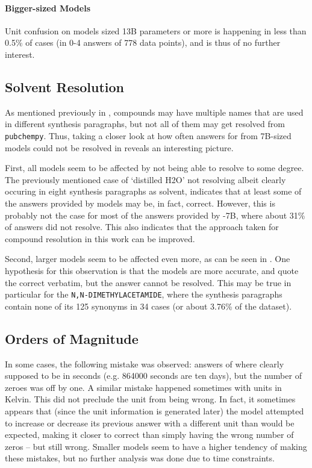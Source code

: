 \paragraph{Bigger-sized Models}
Unit confusion on models sized 13B parameters or more is happening in less than 0.5\% of cases (in 0-4 answers of 778 data points), and is thus of no further interest.


\subsection{Solvent Resolution}\label{sub:solv}
As mentioned previously in , compounds may have multiple names that are used in different synthesis paragraphs, but not all of them may get resolved from \texttt{pubchempy}.
Thus, taking a closer look at how often answers for \tsolv from 7B-sized models could not be resolved in  reveals an interesting picture.

First, all models seem to be affected by not being able to resolve \tsolv to some degree.
The previously mentioned case of `distilled H2O' not resolving albeit clearly occuring in eight synthesis paragraphs as solvent, indicates that at least some of the answers provided by models may be, in fact, correct.
However, this is probably not the case for most of the answers provided by -7B, where about 31\% of answers did not resolve.
This also indicates that the approach taken for compound resolution in this work can be improved.

Second, larger models seem to be affected even more, as can be seen in .
One hypothesis for this observation is that the models are more accurate, and quote the correct \tsolv verbatim, but the answer cannot be resolved.
This may be true in particular for the \tsolv \texttt{N,N-DIMETHYLACETAMIDE}, where the synthesis paragraphs contain none of its 125 synonyms in 34 cases (or about 3.76\% of the dataset).

\subsection{Orders of Magnitude}\label{sub:oom}
In some cases, the following mistake was observed:
answers of \ttime where clearly supposed to be in seconds (e.g. 864000 seconds are ten days), but the number of zeroes was off by one.
A similar mistake happened sometimes with \ttemp units in Kelvin.
This did not preclude the unit from being wrong.
In fact, it sometimes appears that (since the unit information is generated later) the model attempted to increase or decrease its previous answer with a different unit than would be expected, making it closer to correct than simply having the wrong number of zeros -- but still wrong.
Smaller models seem to have a higher tendency of making these mistakes, but no further analysis was done due to time constraints.



